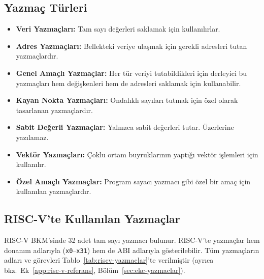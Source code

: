 \subsection{Yazmaç Türleri}

\begin{itemize}
\item \textbf{Veri Yazmaçları:} Tam sayı değerleri saklamak için kullanılırlar.
\item \textbf{Adres Yazmaçları:} Bellekteki veriye ulaşmak için gerekli adresleri tutan yazmaçlardır.
\item \textbf{Genel Amaçlı Yazmaçlar:} Her tür veriyi tutabildikleri için derleyici bu yazmaçları hem değişkenleri hem de adresleri saklamak için kullanabilir.
\item \textbf{Kayan Nokta Yazmaçları:} Ondalıklı sayıları tutmak için özel olarak tasarlanan yazmaçlardır.
\item \textbf{Sabit Değerli Yazmaçlar:} Yalnızca sabit değerleri tutar. Üzerlerine yazılamaz.
\item \textbf{Vektör Yazmaçları:} Çoklu ortam buyruklarının yaptığı vektör işlemleri için kullanılır.
\item \textbf{Özel Amaçlı Yazmaçlar:} Program sayacı yazmacı gibi özel bir amaç için kullanılan yazmaçlardır.
\end{itemize}

\subsection{RISC-V'te Kullanılan Yazmaçlar}

RISC-V BKM'sinde 32 adet tam sayı yazmacı bulunur. RISC-V'te yazmaçlar hem donanım adlarıyla (\texttt{x0}--\texttt{x31}) hem de ABI adlarıyla gösterilebilir. Tüm yazmaçların adları ve görevleri Tablo~\ref{tab:riscv-yazmaclar}'te verilmiştir (ayrıca bkz.\ Ek~\ref{app:risc-v-referans}, Bölüm~\ref{sec:ekc-yazmaclar}).

